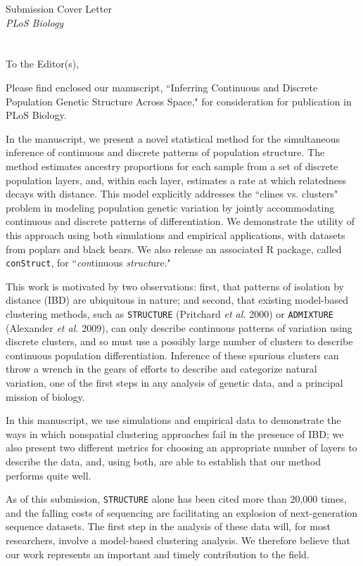 \documentclass[11pt]{letter}
\begin{document}

Submission Cover Letter\\
\emph{PLoS Biology}
\\\\\\
To the Editor(s),

Please find enclosed our manuscript,  
``Inferring Continuous and Discrete Population Genetic Structure Across Space,"
for consideration for publication in PLoS Biology.

In the manuscript, we present a novel statistical method 
for the simultaneous inference of continuous and discrete patterns of population structure.
The method estimates ancestry proportions for each 
sample from a set of discrete population layers, 
and, within each layer, estimates a rate at which relatedness decays with distance.
This model explicitly addresses the ``clines vs. clusters" problem in 
modeling population genetic variation by jointly accommodating 
continuous and discrete patterns of differentiation. 
We demonstrate the utility of this approach using both simulations 
and empirical applications, with datasets from poplars and black bears. 
We also release an associated R package, called \texttt{conStruct}, 
for ``\emph{con}tinuous \emph{struct}ure."

This work is motivated by two observations:
first, that patterns of isolation by distance (IBD) are ubiquitous in nature; 
and second, that existing model-based clustering methods, 
such as \texttt{STRUCTURE} (Pritchard \emph{et al.} 2000) 
or \texttt{ADMIXTURE} (Alexander \emph{et al.} 2009), 
can only describe continuous patterns of variation using discrete clusters, 
and so must use a possibly large number of clusters
to describe continuous population differentiation.
Inference of these spurious clusters can throw a 
wrench in the gears of efforts to describe and categorize natural variation, 
one of the first steps in any analysis of genetic data, 
and a principal mission of biology.  

In this manuscript,
we use simulations and empirical data to demonstrate 
the ways in which nonspatial clustering approaches 
fail in the presence of IBD; 
we also present two different metrics for choosing an appropriate 
number of layers to describe the data, 
and, using both, 
are able to establish that our method performs quite well.

As of this submission, \texttt{STRUCTURE} alone has been cited more than 20,000 times, 
and the falling costs of sequencing are facilitating an explosion of next-generation sequence datasets.  
The first step in the analysis of these data will, for most researchers, 
involve a model-based clustering analysis.
We therefore believe that our work represents an important and timely contribution to the field.  
\end{document}
